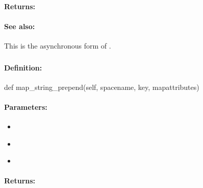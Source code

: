 \paragraph{Returns:}


\paragraph{See also:}  This is the asynchronous form of .

\pagebreak
\subsubsection{}
\label{api:python:map_string_prepend}


\paragraph{Definition:}
\begin{pythoncode}
def map_string_prepend(self, spacename, key, mapattributes)
\end{pythoncode}

\paragraph{Parameters:}
\begin{itemize}[noitemsep]
\item {}\\

\item {}\\

\item {}\\

\end{itemize}

\paragraph{Returns:}


\pagebreak
\subsubsection{}
\label{api:python:async_map_string_prepend}



